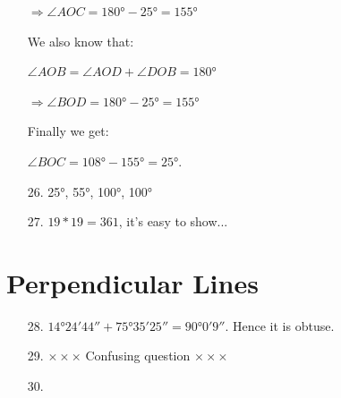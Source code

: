 \begin{enumerate}
	$\Rightarrow \angle AOC = \ang{180} - \ang{25} = \ang{155}$
	
	We also know that:
	
	$\angle AOB = \angle AOD + \angle DOB = \ang{180}$
	
	$\Rightarrow \angle BOD = \ang{180} - \ang{25} = \ang{155}$
	
	Finally we get:
	
	$\angle BOC = \ang{108} - \ang{155} = \ang{25}$.
	
	\item[26.] \ang{25}, \ang{55}, \ang{100}, \ang{100}
	
	\item[27.] $19*19=361$, it's easy to show...
	
\end{enumerate}

\section{Perpendicular Lines}
\begin{enumerate}
	\item[28.] $\ang{14;24;44} + \ang{75;35;25} = \ang{90;0;9}$. Hence it is obtuse.
	
	\item[29.] $\times\times\times$ Confusing question $\times\times\times$
	
	\item[30.] 
\end{enumerate}